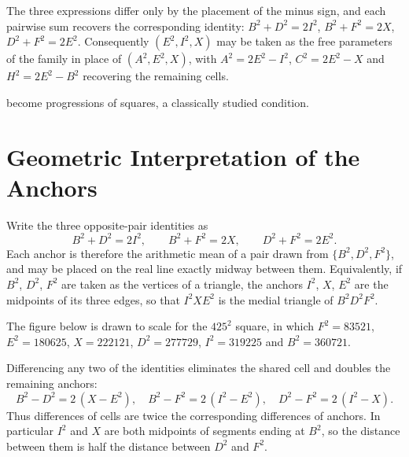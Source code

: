 \documentclass[12pt]{article}
\begin{document}
The three expressions differ only by the placement of the minus
sign, and each pairwise sum recovers the corresponding identity:
$B^2 + D^2 = 2I^2$, $B^2 + F^2 = 2X$, $D^2 + F^2 = 2E^2$.
Consequently $(E^2, I^2, X)$ may be taken as the free parameters
of the family in place of $(A^2, E^2, X)$, with
$A^2 = 2E^2 - I^2$, $C^2 = 2E^2 - X$ and $H^2 = 2E^2 - B^2$
recovering the remaining cells.

become progressions of squares, a classically studied condition.

\section{Geometric Interpretation of the Anchors}

Write the three opposite-pair identities as
\[
B^2 + D^2 = 2I^2, \qquad B^2 + F^2 = 2X, \qquad D^2 + F^2 = 2E^2 .
\]
Each anchor is therefore the arithmetic mean of a pair drawn from
$\{B^2, D^2, F^2\}$, and may be placed on the real line exactly midway
between them. Equivalently, if $B^2$, $D^2$, $F^2$ are taken as the
vertices of a triangle, the anchors $I^2$, $X$, $E^2$ are the midpoints
of its three edges, so that $I^2XE^2$ is the medial triangle of
$B^2D^2F^2$.

The figure below is drawn to scale for the $425^2$ square, in which
$F^2 = 83521$, $E^2 = 180625$, $X = 222121$, $D^2 = 277729$,
$I^2 = 319225$ and $B^2 = 360721$.

\begin{center}
\end{center}

Differencing any two of the identities eliminates the shared cell and
doubles the remaining anchors:
\[
B^2 - D^2 = 2\,(X - E^2), \quad
B^2 - F^2 = 2\,(I^2 - E^2), \quad
D^2 - F^2 = 2\,(I^2 - X).
\]
Thus differences of cells are twice the corresponding differences of
anchors. In particular $I^2$ and $X$ are both midpoints of segments
ending at $B^2$, so the distance between them is half the distance
between $D^2$ and $F^2$.
\end{document}

